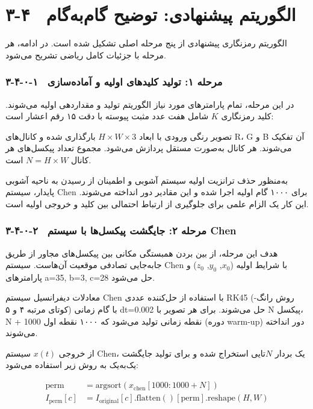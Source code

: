 \section{۳-۴  الگوریتم پیشنهادی: توضیح گام‌به‌گام}

الگوریتم رمزنگاری پیشنهادی از پنج مرحله اصلی تشکیل شده است. در ادامه، هر مرحله با جزئیات کامل ریاضی تشریح می‌شود.

\subsubsection{۳-۴-۰-۱  مرحله ۱: تولید کلیدهای اولیه و آماده‌سازی}

در این مرحله، تمام پارامترهای مورد نیاز الگوریتم تولید و مقداردهی اولیه می‌شوند. کلید رمزنگاری $K$ شامل هفت عدد مثبت پیوسته با دقت ۱۵ رقم اعشار است:

تصویر رنگی ورودی با ابعاد $H \times W \times 3$ بارگذاری شده و کانال‌های ‎R‎، ‎G‎ و ‎B‎ آن تفکیک می‌شوند. هر کانال به‌صورت مستقل پردازش می‌شود. مجموع تعداد پیکسل‌های هر کانال $N = H \times W$ است.

به‌منظور حذف ترانزیت اولیه سیستم آشوبی و اطمینان از رسیدن به ناحیه آشوبی پایدار، سیستم ‎Chen‎ برای ۱۰۰۰ گام اولیه اجرا شده و این مقادیر دور انداخته می‌شوند.  این کار یک الزام علمی برای جلوگیری از ارتباط احتمالی بین کلید و خروجی اولیه است.

\subsubsection{۳-۴-۰-۲  مرحله ۲: جایگشت پیکسل‌ها با سیستم ‎Chen‎}

هدف این مرحله، از بین بردن همبستگی مکانی بین پیکسل‌های مجاور از طریق جابه‌جایی تصادفی موقعیت آن‌هاست. سیستم ‎Chen‎ با شرایط اولیه ($x_0$, $y_0$, $z_0$) و پارامترهای ‎a=35‎, ‎b=3‎, ‎c=28‎ حل می‌شود.

معادلات دیفرانسیل سیستم ‎Chen‎ با استفاده از حل‌کننده عددی ‎RK45‎ (روش رانگ-کوتای مرتبه ۴ و ۵) با گام زمانی ‎dt=0.002‎ حل می‌شوند.  برای هر تصویر با ‎N‎ پیکسل، ‎N‎ + ‎1000‎ نقطه زمانی تولید می‌شود که ۱۰۰۰ نقطه اول (دوره ‎warm-up‎) دور انداخته می‌شوند\cite{ref6}.

از خروجی $x(t)$ سیستم ‎Chen‎، یک بردار $N$تایی استخراج شده و برای تولید جایگشت یک‌به‌یک به روش زیر استفاده می‌شود:

\begin{align}
\mathrm{perm} &= \mathrm{argsort}\left(x_{\mathrm{chen}}[1000:1000+N]\right) \\
I_{\mathrm{perm}}[c] &= I_{\mathrm{original}}[c].\mathrm{flatten()}[\mathrm{perm}].\mathrm{reshape}(H,W)
\label{eq:ch3-perm}
\end{align}

